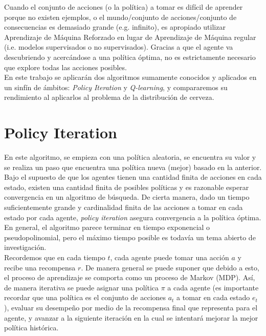 Cuando el conjunto de acciones (o la pol\'itica) a tomar es dif\'icil de aprender porque no existen ejemplos, o el mundo/conjunto de acciones/conjunto de consecuencias es demasiado grande (e.g. infinito), es apropiado utilizar Aprendizaje de M\'aquina Reforzado en lugar de Aprendizaje de M\'aquina regular (i.e. modelos supervisados o no supervisados). Gracias a que el agente va descubriendo y acerc\'andose a una pol\'itica \'optima, no es estrictamente necesario que explore todas las acciones posibles. \\

En este trabajo se aplicar\'an dos algoritmos sumamente conocidos y aplicados en un sinf\'in de \'ambitos: \textit{Policy Iteration} y \textit{Q-learning}, y compararemos su rendimiento al aplicarlos al problema de la distribuci\'on de cerveza.

\section{Policy Iteration}

En este algoritmo, se empieza con una pol\'itica aleatoria, se encuentra su valor y se realiza un paso que encuentra una pol\'itica nueva (mejor) basado en la anterior. Bajo el supuesto de que los agentes tienen una cantidad finita de acciones en cada estado, existen una cantidad finita de posibles pol\'iticas y es razonable esperar convergencia en un algoritmo de b\'usqueda. De cierta manera, dado un tiempo suficientemente grande y cardinalidad finita de las acciones a tomar en cada estado por cada agente, \textit{policy iteration} asegura convergencia a la pol\'itica \'optima. En general, el algoritmo parece terminar en tiempo exponencial o pseudopolinomial, pero el m\'aximo tiempo posible es todav\'ia un tema abierto de investigaci\'on.\\

Recordemos que en cada tiempo $t$, cada agente puede tomar una acci\'on $a$ y recibe una recompensa $r$. De manera general se puede suponer que debido a esto, el proceso de aprendizaje se comporta como un proceso de Markov (MDP). As\'i, de manera iterativa se puede asignar una pol\'itica $\pi$ a cada agente (es importante recordar que una pol\'itica es el conjunto de acciones $a_t$ a tomar en cada estado $e_t$), evaluar su desempe\~no por medio de la recompensa final que representa para el agente, y avanzar a la siguiente iteraci\'on en la cual se intentar\'a mejorar la mejor pol\'itica hist\'orica.\\

